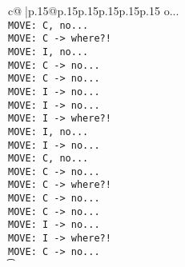 \documentclass{article}
\begin{document}
{\begin{supertabular}{c@{$\;$}|p{.15\linewidth}@{}p{.15\linewidth}p{.15\linewidth}p{.15\linewidth}p{.15\linewidth}p{.15\linewidth}}
{{{o...\\ \tt  MOVE: C, no...\\ \tt  MOVE: C -> where?!\\ \tt  MOVE: I, no...\\ \tt  MOVE: C -> no...\\ \tt  MOVE: C -> no...\\ \tt  MOVE: I -> no...\\ \tt  MOVE: I -> no...\\ \tt  MOVE: I -> where?!\\ \tt  MOVE: I, no...\\ \tt  MOVE: I -> no...\\ \tt  MOVE: C, no...\\ \tt  MOVE: C -> no...\\ \tt  MOVE: C -> where?!\\ \tt  MOVE: C -> no...\\ \tt  MOVE: C -> no...\\ \tt  MOVE: I -> no...\\ \tt  MOVE: I -> where?!\\ \tt  MOVE: C -> no...\\ \t}}}
\end{supertabular}}
\end{document}
